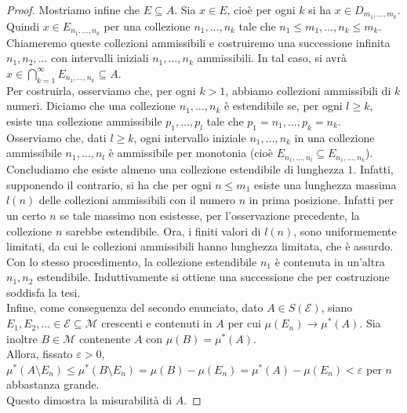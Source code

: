 \documentclass[a4paper, twoside]{article}
\newcommand{\ra}{\rightarrow}
\newcommand{\e}{\varepsilon}
\newcommand{\<}{\langle}
\renewcommand{\>}{\rangle}
\begin{document}
\begin{proof}
	Mostriamo infine che $E \subseteq A$. Sia $x \in E$, cioè per ogni $k$ si ha $x \in D_{m_{1}, \ldots, m_{k}}$. Quindi $x \in E_{n_{1}, \ldots, n_{k}}$ per una collezione $n_{1}, \ldots, n_{k}$ tale che $n_{1} \leq m_{1}, \ldots, n_{k} \leq m_{k}$.\\
	Chiameremo queste collezioni ammissibili e costruiremo una successione infinita $n_{1}, n_{2}, \ldots$ con intervalli iniziali $n_{1}, \ldots, n_{k}$ ammissibili.	In tal caso, si avrà $x \in \bigcap_{k=1}^{\infty} E_{n_{1}, \ldots, n_{k}} \subseteq A$.\\
	Per costruirla, osserviamo che, per ogni $k>1$, abbiamo collezioni ammissibili di $k$ numeri. Diciamo che una collezione $n_{1}, \ldots, n_{k}$ è estendibile se, per ogni $l \geq k$, esiste una collezione ammissibile $p_{1}, \ldots, p_{l}$ tale che $p_1=n_1,...,p_k=n_k$.\\
	Osserviamo che, dati  $l \geq k$, ogni intervallo iniziale $n_{1}, \ldots, n_{k}$ in una collezione ammissibile $n_{1}, \ldots, n_{l}$ è ammissibile per monotonia (cioè $E_{n_{1}, \ldots, n_{l}} \subseteq E_{n_{1}, \ldots, n_{k}}$).\\
	Concludiamo che esiste almeno una collezione estendibile di lunghezza $1$. Infatti, supponendo il contrario, si ha che per ogni $n \leq m_{1}$ esiste una lunghezza massima $l(n)$ delle collezioni ammissibili con il numero $n$ in prima posizione. Infatti per un certo $n$ se tale massimo non esistesse, per l'osservazione precedente, la collezione $n$ sarebbe estendibile. Ora, i finiti valori di $l(n)$, sono uniformemente limitati, da cui le collezioni ammissibili hanno lunghezza limitata, che è assurdo.\\
	Con lo stesso procedimento, la collezione estendibile $n_{1}$ è contenuta in un'altra $n_{1}, n_{2}$ estendibile. Induttivamente si ottiene una successione che per costruzione soddisfa la tesi.\\
	Infine, come conseguenza del secondo enunciato, dato $A \in S(\mathcal{E})$, siano $E_1, E_2 ,... \in \mathcal{E} \subseteq \mathcal{M} $ crescenti e contenuti in $A$ per cui $\mu(E_n) \ra \mu^*(A)$. Sia inoltre $B \in \mathcal{M}$ contenente $A$ con $\mu(B)=\mu^*(A)$.\\
	Allora, fissato $\e >0$, $\mu^*(A \setminus E_n) \leq \mu^*(B \setminus E_n)  = \mu(B) - \mu(E_n) = \mu^*(A)  - \mu(E_n) < \e $  per $n$ abbastanza grande.\\
	Questo dimostra la misurabilità di $A$.
\end{proof}
\end{document}
